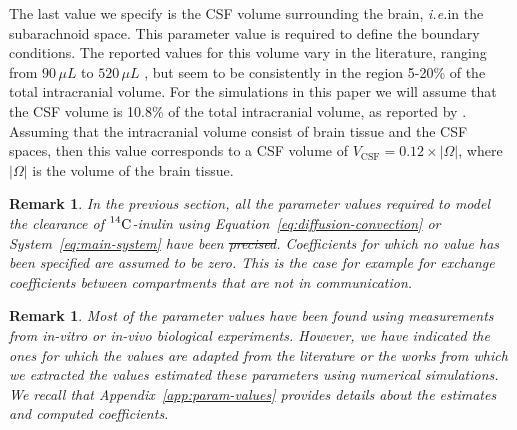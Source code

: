\documentclass[10pt]{article}
\newcommand{\ie}{\emph{i.e.}\;}
\newcommand{\1}{^{(1)}}
\newcommand{\2}{^{(2)}}
\newcommand{\Cinulin}{$\prescript{14}{}{\text{C}}$-inulin }
\newtheorem{remark}[theorem]{Remark}
\newcommand{\corr}[1]{\textcolor{blue}{#1}} %
\providecommand{\DIFaddtex}[1]{{\protect\color{blue}\uwave{#1}}} %
\providecommand{\DIFdeltex}[1]{{\protect\color{red}\sout{#1}}}                      %
\providecommand{\DIFaddbegin}{} %
\providecommand{\DIFaddend}{} %
\providecommand{\DIFdelbegin}{} %
\providecommand{\DIFdelend}{} %
\providecommand{\DIFadd}[1]{\texorpdfstring{\DIFaddtex{#1}}{#1}} %
\providecommand{\DIFdel}[1]{\texorpdfstring{\DIFdeltex{#1}}{}} %
\newcommand{\DIFscaledelfig}{0.5}
\newlength{\DIFdelgraphicswidth} %
\newlength{\DIFdelgraphicsheight} %
\newcommand{\DIFaddincludegraphics}[2][]{{\color{blue}\fbox{\DIFOincludegraphics[#1]{#2}}}} %
\newcommand{\DIFdelincludegraphics}[2][]{%
\sbox{\DIFdelgraphicsbox}{\DIFOincludegraphics[#1]{#2}}%
\settoboxwidth{\DIFdelgraphicswidth}{\DIFdelgraphicsbox} %
\settoboxtotalheight{\DIFdelgraphicsheight}{\DIFdelgraphicsbox} %
\scalebox{\DIFscaledelfig}{%
\parbox[b]{\DIFdelgraphicswidth}{\usebox{\DIFdelgraphicsbox}\\[-\baselineskip] \rule{\DIFdelgraphicswidth}{0em}}\llap{\resizebox{\DIFdelgraphicswidth}{\DIFdelgraphicsheight}{%
\setlength{\unitlength}{\DIFdelgraphicswidth}%
\begin{picture}(1,1)%
\thicklines\linethickness{2pt} %
{\color[rgb]{1,0,0}\put(0,0){\framebox(1,1){}}}%
{\color[rgb]{1,0,0}\put(0,0){\line( 1,1){1}}}%
{\color[rgb]{1,0,0}\put(0,1){\line(1,-1){1}}}%
\end{picture}%
}\hspace*{3pt}}} %
} %
\DeclareRobustCommand{\DIFaddbegin}{\DIFOaddbegin \let\includegraphics\DIFaddincludegraphics} %
\DeclareRobustCommand{\DIFaddend}{\DIFOaddend \let\includegraphics\DIFOincludegraphics} %
\DeclareRobustCommand{\DIFdelbegin}{\DIFOdelbegin \let\includegraphics\DIFdelincludegraphics} %
\DeclareRobustCommand{\DIFdelend}{\DIFOaddend \let\includegraphics\DIFOincludegraphics} %
\begin{document}
The last value we specify is the CSF volume surrounding the brain, \ie in the subarachnoid space. This parameter value is required to define the boundary conditions.  
The reported values for this volume vary in the literature, ranging from $90 \, \si{\mu L}$ \cite{pardridge2011drug} to $520 \, \si{\mu L}$ \cite{lai1983sampling}, but seem to be consistently in the region 5-20\% of the total intracranial volume. For the simulations in this paper we will assume that the CSF volume is 10.8\% of the total intracranial volume, as reported by \cite{murtha2014cerebrospinal}. Assuming that the intracranial volume consist of brain tissue and the CSF spaces, then this value corresponds to a CSF volume of $V_\text{CSF} = 0.12\times |\Omega|$, where $|\Omega|$ is the volume of the brain tissue.

\begin{remark}
In the previous section, all the parameter values required to model the clearance of \Cinulin using Equation~\eqref{eq:diffusion-convection} or System~\eqref{eq:main-system} have been \DIFdelbegin \DIFdel{precised}\DIFdelend \DIFaddbegin \DIFadd{\corr{specified}}\DIFaddend . Coefficients for which no value has been specified are assumed to be zero. This is the case for example for exchange coefficients between compartments that are not in communication.
\end{remark}

\begin{remark}
Most of the parameter values have been found using measurements from \textit{in-vitro} or \textit{in-vivo} biological experiments. However, we have indicated the ones for which the values are adapted from the literature or the works from which we extracted the values estimated these parameters using numerical simulations. We recall that Appendix~\ref{app:param-values} provides details about the estimates and computed coefficients.
\end{remark}
\end{document}
